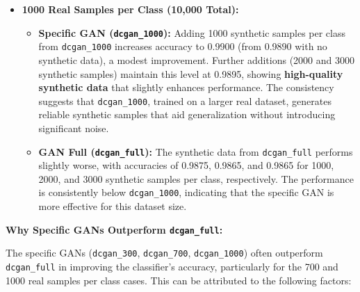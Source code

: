 \documentclass[12pt]{article}
\begin{document}
\begin{itemize}
    \item \textbf{1000 Real Samples per Class (10,000 Total):}
    \begin{itemize}
        \item \textbf{Specific GAN (\texttt{dcgan\_1000}):} Adding 1000 synthetic samples per class from \texttt{dcgan\_1000} increases accuracy to 0.9900 (from 0.9890 with no synthetic data), a modest improvement. Further additions (2000 and 3000 synthetic samples) maintain this level at 0.9895, showing \textbf{high-quality synthetic data} that slightly enhances performance. The consistency suggests that \texttt{dcgan\_1000}, trained on a larger real dataset, generates reliable synthetic samples that aid generalization without introducing significant noise.
        \item \textbf{GAN Full (\texttt{dcgan\_full}):} The synthetic data from \texttt{dcgan\_full} performs slightly worse, with accuracies of 0.9875, 0.9865, and 0.9865 for 1000, 2000, and 3000 synthetic samples per class, respectively. The performance is consistently below \texttt{dcgan\_1000}, indicating that the specific GAN is more effective for this dataset size.
    \end{itemize}
\end{itemize}

\textbf{Why Specific GANs Outperform \texttt{dcgan\_full}:}

The specific GANs (\texttt{dcgan\_300}, \texttt{dcgan\_700}, \texttt{dcgan\_1000}) often outperform \texttt{dcgan\_full} in improving the classifier’s accuracy, particularly for the 700 and 1000 real samples per class cases. This can be attributed to the following factors:
\end{document}
